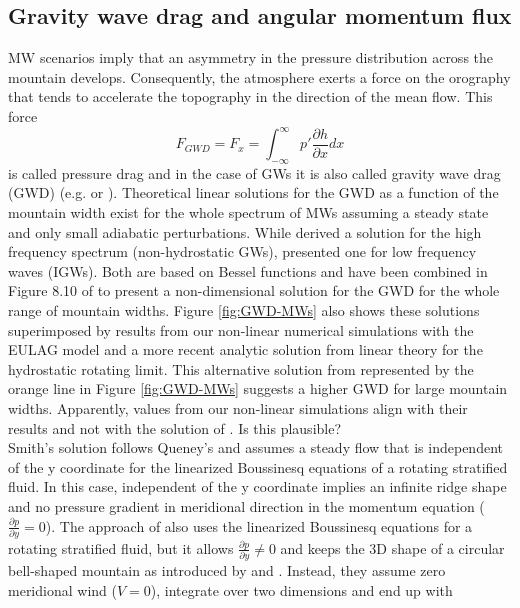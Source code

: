 \subsection*{Gravity wave drag and angular momentum flux}
MW scenarios imply that an asymmetry in the pressure distribution across the mountain develops. Consequently, the atmosphere exerts a force on the orography that tends to accelerate the topography in the direction of the mean flow. This force  
\begin{equation}
    F_{GWD} = F_x = \int_{-\infty}^{\infty} p' \frac{\partial h}{\partial x} dx
    \label{equ:gwd}
\end{equation}
is called pressure drag and in the case of GWs it is also called gravity wave drag (GWD) (e.g. \cite[]{gill_atmosphere-ocean_1982} or \cite[]{durran_lee_2003}). Theoretical linear solutions for the GWD as a function of the mountain width exist for the whole spectrum of MWs assuming a steady state and only small adiabatic perturbations. While \textcite[]{blumen_momentum_1965} derived a solution for the high frequency spectrum (non-hydrostatic GWs), \textcite[]{smith_influence_1979} presented one for low frequency waves (IGWs). Both are based on Bessel functions and have been combined in Figure 8.10 of \textcite[]{gill_atmosphere-ocean_1982} to present a non-dimensional solution for the GWD for the whole range of mountain widths. Figure \ref{fig:GWD-MWs} also shows these solutions superimposed by results from our non-linear numerical simulations with the EULAG model and a more recent analytic solution from linear theory for the hydrostatic rotating limit. This alternative solution from \textcite{miranda_non-linear_1992} represented by the orange line in Figure \ref{fig:GWD-MWs} suggests a higher GWD for large mountain widths. Apparently, values from our non-linear simulations align with their results and not with the solution of \textcite[]{smith_influence_1979}. Is this plausible? \\
Smith's solution follows Queney's and assumes a steady flow that is independent of the y coordinate for the linearized Boussinesq equations of a rotating stratified fluid. In this case, independent of the y coordinate implies an infinite ridge shape and no pressure gradient in meridional direction in the momentum equation ($\frac{\partial p}{\partial y}=0$). The approach of \textcite[]{miranda_non-linear_1992} also uses the linearized Boussinesq equations for a rotating stratified fluid, but it allows $\frac{\partial p}{\partial y}\neq 0$ and keeps the 3D shape of a circular bell-shaped mountain as introduced by \textcite[]{smith_linear_1980} and \textcite[]{phillips_analytical_1984}. Instead, they assume zero meridional wind ($V=0$), integrate over two dimensions and end up with 
